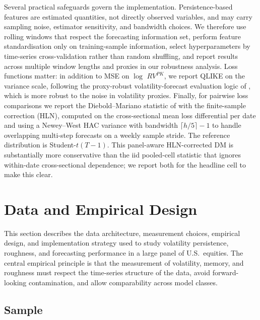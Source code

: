 \documentclass[11pt,a4paper]{article}
\begin{document}
Several practical safeguards govern the implementation. Persistence-based
features are estimated quantities, not directly observed variables, and
may carry sampling noise, estimator sensitivity, and bandwidth choices.
We therefore use rolling windows that respect the forecasting information
set, perform feature standardisation only on training-sample information,
select hyperparameters by time-series cross-validation rather than random
shuffling, and report results across multiple window lengths and proxies
in our robustness analysis. Loss functions matter: in addition to MSE on $\log$ $RV^{PK}$, we report QLIKE on the variance scale, following the proxy-robust volatility-forecast evaluation logic of \citep{patton2011volatility}, which is more robust
to the noise in volatility proxies. Finally, for pairwise loss comparisons
we report the Diebold--Mariano statistic of
\citet{diebold1995comparing} with the
\citet{harvey1997testing} finite-sample correction (HLN), computed on
the cross-sectional mean loss differential per date and using a
Newey--West HAC variance with bandwidth $\lceil h/5\rceil-1$ to handle
overlapping multi-step forecasts on a weekly sample stride. The
reference distribution is Student-$t(T-1)$. This panel-aware
HLN-corrected DM is substantially more conservative than the iid
pooled-cell statistic that ignores within-date cross-sectional
dependence; we report both for the headline cell to make this clear.

\section{Data and Empirical Design}
\label{sec:data}

This section describes the data architecture, measurement choices,
empirical design, and implementation strategy used to study volatility
persistence, roughness, and forecasting performance in a large panel of
U.S.\ equities. The central empirical principle is that the measurement
of volatility, memory, and roughness must respect the time-series
structure of the data, avoid forward-looking contamination, and allow
comparability across model classes.

\subsection{Sample}
\end{document}
